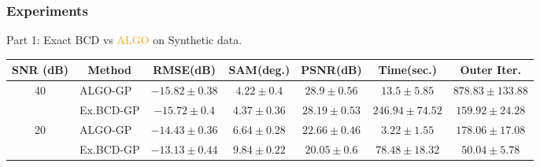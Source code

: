\documentclass[10pt,mathserif]{beamer}
\begin{document}
    \begin{frame}
        \frametitle{Experiments}
        Part 1: Exact BCD vs \textcolor{orange}{ALGO} on Synthetic data.
        \begin{table}[h]
        \centering
        \begin{adjustbox}{max width=\textwidth}
        \begin{tabular}{|c|l|c|c|c|c|c|}
        \hline
        SNR (dB)            & \multicolumn{1}{c|}{Method}& RMSE(dB)                              & SAM(deg.)                             & PSNR(dB)                              & Time(sec.)                              & Outer Iter.           \tabularnewline \hline
        \multirow{2}{*}{40} & ALGO-GP                    & \cellcolor{red!10}$-15.82   \pm 0.38$ & \cellcolor{red!10}$4.22     \pm 0.4$  & \cellcolor{red!10}$28.9     \pm 0.56$ & \cellcolor{red!10}$13.5     \pm 5.85$   & $878.83   \pm 133.88$ \tabularnewline
                            & Ex.BCD-GP                  &                   $-15.72   \pm 0.4$  &                   $4.37     \pm 0.36$ &                   $28.19    \pm 0.53$ &                   $246.94   \pm 74.52$  & $159.92   \pm 24.28$  \tabularnewline \hline
        \multirow{2}{*}{20} & ALGO-GP                    & \cellcolor{red!10}$-14.43   \pm 0.36$ & \cellcolor{red!10}$6.64     \pm 0.28$ & \cellcolor{red!10}$22.66    \pm 0.46$ & \cellcolor{red!10}$3.22     \pm 1.55$   & $178.06   \pm 17.08$  \tabularnewline
                            & Ex.BCD-GP                  &                   $-13.13   \pm 0.44$ &                   $9.84     \pm 0.22$ &                   $20.05    \pm 0.6$  &                   $78.48    \pm 18.32$  & $50.04    \pm 5.78$   \tabularnewline \hline
        \end{tabular}

\end{adjustbox}
\end{table}
\end{frame}
\end{document}
